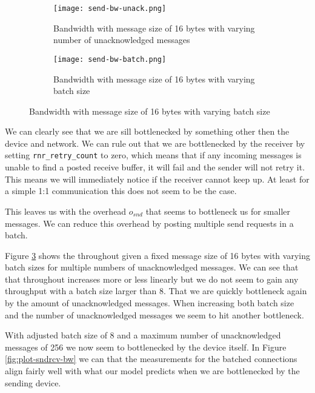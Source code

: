 \begin{figure}[h]
\begin{subfigure}[b]{0.49\textwidth}
  \centering
  \texttt{[image: send-bw-unack.png]}
  \caption{Bandwidth with message size of 16 bytes with varying number of unacknowledged messages}
  \label{fig:plot-sndrcv-bw-unack}
\end{subfigure}
\begin{subfigure}[b]{0.49\textwidth}
  \centering
  \texttt{[image: send-bw-batch.png]}
  \caption{Bandwidth with message size of 16 bytes with varying batch size }
  \label{fig:plot-sndrcv-bw-batch}
\end{subfigure}
\end{figure}



We can clearly see that we are sill bottlenecked by something other then the device and network. We can rule out that we are
bottlenecked by the receiver by setting \texttt{rnr\_retry\_count} to zero, which means that if any incoming messages is unable
to find a posted receive buffer, it will fail and the sender will not retry it. This means we will immediately notice if 
the receiver cannot keep up. At least for a simple 1:1 communication this does not seem to be the case.

This leaves us with the overhead $o_{snd}$ that seems to bottleneck us for smaller messages. We can reduce this overhead by 
posting multiple send requests in a batch. 

Figure \ref{fig:plot-sndrcv-bw-batch} shows the throughout given a fixed message size of 16 bytes with varying batch sizes for
multiple numbers of unacknowledged messages. We can see that that throughout increases more or less linearly but we do not seem
to gain any throughput with a batch size larger than 8. That we are quickly bottleneck again by the amount of unacknowledged 
messages. When increasing both batch size and the number of unacknowledged messages we seem to hit another bottleneck.

With adjusted batch size of 8 and a maximum number of unacknowledged messages of 256 we now seem to bottlenecked by the 
device itself. In Figure \ref{fig:plot-sndrcv-bw} we can that the measurements for the batched connections align fairly 
well with what our model predicts when we are bottlenecked by the sending device.

